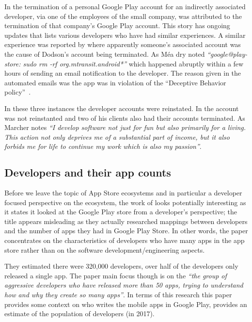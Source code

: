 In \textcite{martinez2019_google_just_terminated_our_startup_google_play_publisher_account_on_xmas_day} the termination of a personal Google Play account for an indirectly associated developer, via one of the employees of the small company, was attributed to the termination of that company's Google Play account. This story has ongoing updates that lists various developers who have had similar experiences. A similar experience was reported by \textcite{dodson2019_google_completely_terminated_our_new_business_etc} where apparently someone's associated account was the cause of Dodson's account being terminated. As Méa dry noted \emph{``google@play-store: sudo rm -rf org.mtransit.android*''} which happened abruptly within a few hours of sending an email notification to the developer. The reason given in the automated emails was the app was in violation of the ``Deceptive Behavior policy''~. 

In these three instances the developer accounts were reinstated. In \textcite{marcher2021_how_google_terminated-a-developer} the account was not reinstanted and two of his clients also had their accounts terminated. As Marcher notes \emph{``I develop software not just for fun but also primarily for a living. This action not only deprives me of a substantial part of income, but it also forbids me for life to continue my work which is also my passion''}. %

\subsection{Developers and their app counts}
Before we leave the topic of App Store ecosystems and in particular a developer focused perspective on the ecosystem, the work of \textcite{wang2017_exploratory_study_of_the_mobile_app_ecosystem} looks potentially interesting as it states it looked at the Google Play store from a developer's perspective; the title appears misleading as they actually researched mappings between developers and the number of apps they had in Google Play Store. In other words, the paper concentrates on the characteristics of developers who have many apps in the app store rather than on the software development/engineering aspects.

They estimated there were 320,000 developers, over half of the developers only released a single app. The paper main focus though is on the \emph{``the group of aggressive developers who have released more than 50 apps, trying to understand how and why they create so many apps''}. In terms of this research this paper provides some context on who writes the mobile apps in Google Play, provides an estimate of the population of developers (in 2017).


